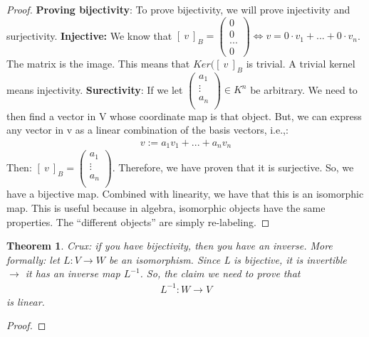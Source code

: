 \documentclass[a4paper, 12pt]{article}
\newtheorem{theorem}{Theorem}
\theoremstyle{definition}
\theoremstyle{definition}
\theoremstyle{definition}
\theoremstyle{definition}
\begin{document}
{\begin{proof}
\textbf{Proving bijectivity}: To prove bijectivity, we will prove injectivity and surjectivity. 
\newline
\newline
\textbf{Injective:} We know that $[\ v\ ]_B = \begin{pmatrix}
	0 \\
	0 \\
	... \\
	0 
\end{pmatrix} \iff v = 0 \cdot v_1 + ... + 0 \cdot v_n$. The matrix is the image. This means that $Ker([\ v\ ]_B$ is trivial. A trivial kernel means injectivity. 
\newline
\newline
\textbf{Surectivity}: If we let $\begin{pmatrix}
	a_1 \\
	\vdots \\
	a_n \\
\end{pmatrix} \in K^n$ be arbitrary. We need to then find a vector in V whose coordinate map is that object. But, we can express any vector in v as a linear combination of the basis vectors, i.e.,: 
\begin{align*}
	v:= a_1 v_1 + ... + a_n v_n 
\end{align*}
Then: $[\ v\ ]_B = \begin{pmatrix}
	a_1 \\
	\vdots \\
	a_n \\
\end{pmatrix}$. Therefore, we have proven that it is surjective. 
\newline
So, we have a bijective map. Combined with linearity, we have that this is an isomorphic map. This is useful because in algebra, isomorphic objects have the same properties. The ``different objects'' are simply re-labeling. 
\end{proof}
\begin{theorem}
	Crux: if you have bijectivity, then you have an inverse. 
	\newline
	More formally: let $L : V \rightarrow W$ be an isomorphism. Since L is bijective, it is invertible $\rightarrow$ it has an inverse map $L^{-1}$. So, the claim we need to prove that 
	\begin{align*}
		L^{-1}: W \rightarrow V
	\end{align*}
	is linear. 
\end{theorem}
\begin{proof}

\end{proof}}
\end{document}

